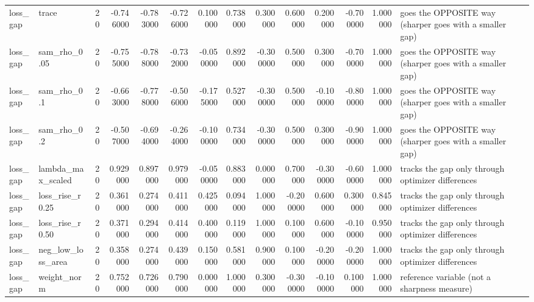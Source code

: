 \begin{tabular}{llrrrrrrrrrrrl}
loss\_gap & trace & 20 & -0.746000 & -0.783000 & -0.726000 & 0.100000 & 0.738000 & 0.300000 & 0.600000 & 0.200000 & -0.700000 & 1.000000 & goes the OPPOSITE way (sharper goes with a smaller gap) \\
loss\_gap & sam\_rho\_0.05 & 20 & -0.755000 & -0.788000 & -0.732000 & -0.050000 & 0.892000 & -0.300000 & 0.500000 & 0.300000 & -0.700000 & 1.000000 & goes the OPPOSITE way (sharper goes with a smaller gap) \\
loss\_gap & sam\_rho\_0.1 & 20 & -0.663000 & -0.778000 & -0.506000 & -0.175000 & 0.527000 & -0.300000 & 0.500000 & -0.100000 & -0.800000 & 1.000000 & goes the OPPOSITE way (sharper goes with a smaller gap) \\
loss\_gap & sam\_rho\_0.2 & 20 & -0.507000 & -0.694000 & -0.264000 & -0.100000 & 0.734000 & -0.300000 & 0.500000 & 0.300000 & -0.900000 & 1.000000 & goes the OPPOSITE way (sharper goes with a smaller gap) \\
loss\_gap & lambda\_max\_scaled & 20 & 0.929000 & 0.897000 & 0.979000 & -0.050000 & 0.883000 & 0.000000 & 0.700000 & -0.300000 & -0.600000 & 1.000000 & tracks the gap only through optimizer differences \\
loss\_gap & loss\_rise\_r0.25 & 20 & 0.361000 & 0.274000 & 0.411000 & 0.425000 & 0.094000 & 1.000000 & -0.200000 & 0.600000 & 0.300000 & 0.845000 & tracks the gap only through optimizer differences \\
loss\_gap & loss\_rise\_r0.50 & 20 & 0.371000 & 0.294000 & 0.414000 & 0.400000 & 0.119000 & 1.000000 & 0.100000 & 0.600000 & -0.100000 & 0.950000 & tracks the gap only through optimizer differences \\
loss\_gap & neg\_low\_loss\_area & 20 & 0.358000 & 0.274000 & 0.439000 & 0.150000 & 0.581000 & 0.900000 & 0.100000 & -0.200000 & -0.200000 & 1.000000 & tracks the gap only through optimizer differences \\
loss\_gap & weight\_norm & 20 & 0.752000 & 0.726000 & 0.790000 & 0.000000 & 1.000000 & 0.300000 & -0.300000 & -0.100000 & 0.100000 & 1.000000 & reference variable (not a sharpness measure) \\
\bottomrule
\end{tabular}
